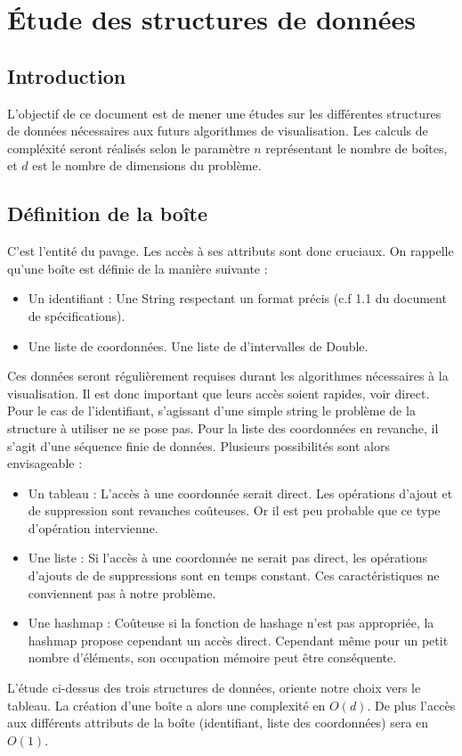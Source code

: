 \chapter{Étude des structures de données}

\section{Introduction}
L'objectif de ce document est de mener une études sur les différentes structures de données nécessaires aux futurs algorithmes de visualisation. Les calculs de compléxité seront réalisés selon le paramètre $n$  représentant le nombre de boîtes, et $d$ est le nombre de dimensions du problème.


\section{Définition de la boîte}
C'est l'entité du pavage. Les accès à ses attributs sont donc cruciaux. On rappelle qu'une boîte est définie de la manière suivante : 
\begin{itemize}
 \item 
Un identifiant : Une String respectant un format précis (c.f 1.1 du document de spécifications).
\item
Une liste de coordonnées. Une liste de d'intervalles de Double.
\end{itemize}

Ces données seront régulièrement requises durant les algorithmes nécessaires à la visualisation. Il est donc important que leurs accès soient rapides, voir direct. Pour le cas de l'identifiant, s'agissant d'une simple string le problème de la structure à utiliser ne se pose pas. Pour la liste des coordonnées en revanche, il s'agit d'une séquence finie de données. Plusieurs possibilités sont alors envisageable : 

\begin{itemize}
 \item
Un tableau : L'accès à une coordonnée serait direct. Les opérations d'ajout et de suppression sont revanches coûteuses. Or il est peu probable que ce type d'opération intervienne.
\item
Une liste : Si l'accès à une coordonnée ne serait pas direct, les opérations d'ajouts de de suppressions sont en temps constant. Ces caractéristiques ne conviennent pas à notre problème.
\item
Une hashmap : Coûteuse si la fonction de hashage n'est pas appropriée, la hashmap propose cependant un accès direct. Cependant même pour un petit nombre d'éléments, son occupation mémoire peut être conséquente. 
\end{itemize}
L'étude ci-dessus des trois structures de données, oriente notre choix vers le tableau. La création d'une boîte a alors une complexité en $O(d)$. De plus l'accès aux différents attributs de la boîte (identifiant, liste des coordonnées) sera en $O(1)$.



